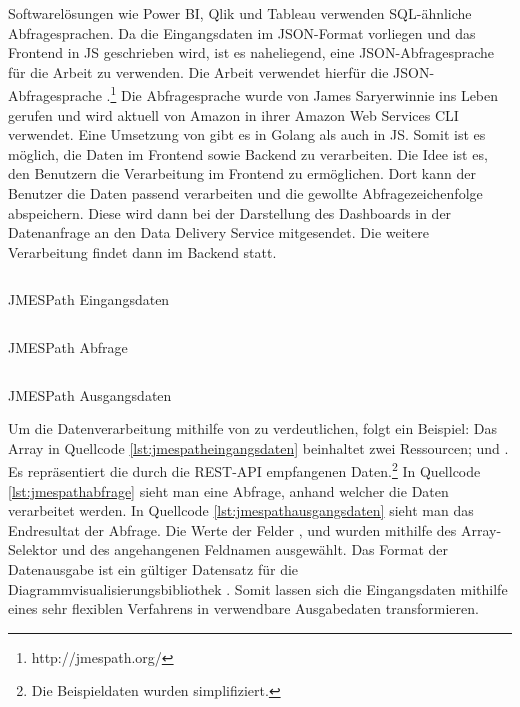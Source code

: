 Softwarelösungen wie Power BI, Qlik und Tableau verwenden SQL-ähnliche Abfragesprachen.
Da die Eingangsdaten im JSON-Format vorliegen und das Frontend in JS geschrieben wird,
ist es naheliegend, eine JSON-Abfragesprache für die Arbeit zu verwenden. Die Arbeit
verwendet hierfür die JSON-Abfragesprache .\footnote{http://jmespath.org/}
Die Abfragesprache wurde von James Saryerwinnie ins Leben gerufen und wird aktuell von
Amazon in ihrer Amazon Web Services CLI verwendet.\cite{AWSJMESPath} Eine Umsetzung von
 gibt es in Golang als auch in JS. Somit ist es möglich, die Daten im
Frontend sowie Backend zu verarbeiten. Die Idee ist es, den Benutzern die Verarbeitung
im Frontend zu ermöglichen. Dort kann der Benutzer die Daten passend verarbeiten und die
gewollte Abfragezeichenfolge abspeichern. Diese wird dann bei der Darstellung des 
Dashboards in der Datenanfrage an den Data Delivery Service mitgesendet.
Die weitere Verarbeitung findet dann im Backend statt.

\begin{listing}[]
    \inputminted{jsx}{snippets/json/jmespath-example/jmespathinput.json}
    \caption{JMESPath Eingangsdaten}
    \label{lst:jmespatheingangsdaten}
\end{listing}

\begin{listing}[]
    \inputminted{jsx}{snippets/json/jmespath-example/jmespathquery.txt}
    \caption{JMESPath Abfrage}
    \label{lst:jmespathabfrage}
\end{listing}

\begin{listing}[]
    \inputminted{jsx}{snippets/json/jmespath-example/jmespathoutput.json}
    \caption{JMESPath Ausgangsdaten}
    \label{lst:jmespathausgangsdaten}
\end{listing}

Um die Datenverarbeitung mithilfe von  zu verdeutlichen, folgt ein
Beispiel: Das Array in Quellcode \ref{lst:jmespatheingangsdaten} beinhaltet zwei Ressourcen;
 und . Es repräsentiert die durch die REST-API empfangenen
Daten.\footnote{Die Beispieldaten wurden simplifiziert.} In Quellcode \ref{lst:jmespathabfrage}
sieht man eine Abfrage, anhand welcher die Daten verarbeitet werden. In Quellcode \ref{lst:jmespathausgangsdaten}
sieht man das Endresultat der Abfrage. Die Werte der Felder ,  und 
wurden mithilfe des Array-Selektor \code{[]} und des angehangenen Feldnamen ausgewählt.
Das Format der Datenausgabe ist ein gültiger Datensatz für die Diagrammvisualisierungsbibliothek
. Somit lassen sich die Eingangsdaten mithilfe eines sehr flexiblen Verfahrens
in verwendbare Ausgabedaten transformieren.

